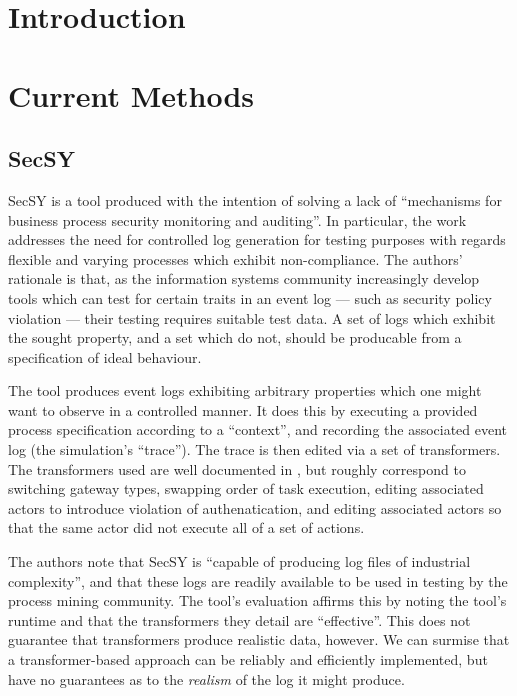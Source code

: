 \documentclass[12pt,draft]{article}
\begin{document}
\maketitle
\begin{abstract}  %
\end{abstract}


\section{Introduction}


\section{Current Methods}


\subsection{SecSY}
SecSY is a tool produced with the intention of solving a lack of
``mechanisms for business process security monitoring and auditing''. In
particular, the work addresses the need for controlled log generation for
testing purposes with regards flexible and varying processes which exhibit
non-compliance. The authors' rationale is that, as the information systems
community increasingly develop tools which can test for certain traits in an
event log --- such as security policy violation --- their testing requires
suitable test data. A set of logs which exhibit the sought property, and a set
which do not, should be producable from a specification of ideal behaviour.
\par

The tool produces event logs exhibiting arbitrary properties which one might
want to observe in a controlled manner. It does this by executing a provided
process specification according to a ``context'', and recording the associated
event log (the simulation's ``trace''). The trace is then edited via a set of
transformers. The transformers used are well documented in , but
roughly correspond to switching gateway types, swapping order of task execution,
editing associated actors to introduce violation of authenatication, and editing
associated actors so that the same actor did not execute all of a set of
actions.
\par

The authors note that SecSY is ``capable of producing log files of industrial
complexity'', and that these logs are readily available to be used in testing by
the process mining community. The tool's evaluation affirms this by noting the
tool's runtime and that the transformers they detail are ``effective''. This
does not guarantee that transformers produce realistic data, however. We can
surmise that a transformer-based approach can be reliably and efficiently
implemented, but have no guarantees as to the \emph{realism} of the log it might
produce.
\par
\end{document}
